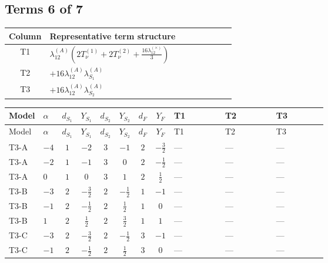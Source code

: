 \documentclass[8pt]{article}
\begin{document}
\begin{landscape}
\subsection*{Terms 6 of 7}
\begin{center}
\begin{tabular}{@{}c >{\raggedright\arraybackslash}p{0.82\linewidth}@{}}
\toprule
Column & Representative term structure \\
\midrule
T1 & \(\displaystyle {\lambda_{12}^{(A)}} \left(2 T_{\nu}^{(1)}+2 T_{\nu}^{(2)}+\frac{16 {\lambda_{12}^{(\times)}}}{3}\right)\) \\
\midrule
T2 & \(\displaystyle +16 {\lambda_{12}^{(A)}} {\lambda_{S_1}^{(A)}}\) \\
\midrule
T3 & \(\displaystyle +16 {\lambda_{12}^{(A)}} {\lambda_{S_2}^{(A)}}\) \\
\midrule
\bottomrule
\end{tabular}
\end{center}
\smallskip
\tiny
\begin{longtable}{@{}llcccccc >{\raggedright\arraybackslash}p{0.21\linewidth} >{\raggedright\arraybackslash}p{0.21\linewidth} >{\raggedright\arraybackslash}p{0.21\linewidth}@{}}
\toprule
Model & $\alpha$ & $d_{S_1}$ & $Y_{S_1}$ & $d_{S_2}$ & $Y_{S_2}$ & $d_F$ & $Y_F$ & T1 & T2 & T3 \\
\midrule
\endfirsthead
\toprule
Model & $\alpha$ & $d_{S_1}$ & $Y_{S_1}$ & $d_{S_2}$ & $Y_{S_2}$ & $d_F$ & $Y_F$ & T1 & T2 & T3 \\
\midrule
\endhead
T3-A & $-4$ & $1$ & $-2$ & $3$ & $-1$ & $2$ & $-\frac{3}{2}$ & --- & --- & --- \\
\midrule
T3-A & $-2$ & $1$ & $-1$ & $3$ & $0$ & $2$ & $-\frac{1}{2}$ & --- & --- & --- \\
\midrule
T3-A & $0$ & $1$ & $0$ & $3$ & $1$ & $2$ & $\frac{1}{2}$ & --- & --- & --- \\
\midrule
T3-B & $-3$ & $2$ & $-\frac{3}{2}$ & $2$ & $-\frac{1}{2}$ & $1$ & $-1$ & --- & --- & --- \\
\midrule
T3-B & $-1$ & $2$ & $-\frac{1}{2}$ & $2$ & $\frac{1}{2}$ & $1$ & $0$ & --- & --- & --- \\
\midrule
T3-B & $1$ & $2$ & $\frac{1}{2}$ & $2$ & $\frac{3}{2}$ & $1$ & $1$ & --- & --- & --- \\
\midrule
T3-C & $-3$ & $2$ & $-\frac{3}{2}$ & $2$ & $-\frac{1}{2}$ & $3$ & $-1$ & --- & --- & --- \\
\midrule
T3-C & $-1$ & $2$ & $-\frac{1}{2}$ & $2$ & $\frac{1}{2}$ & $3$ & $0$ & --- & --- & --- \\

\end{longtable}
\end{landscape}
\end{document}
